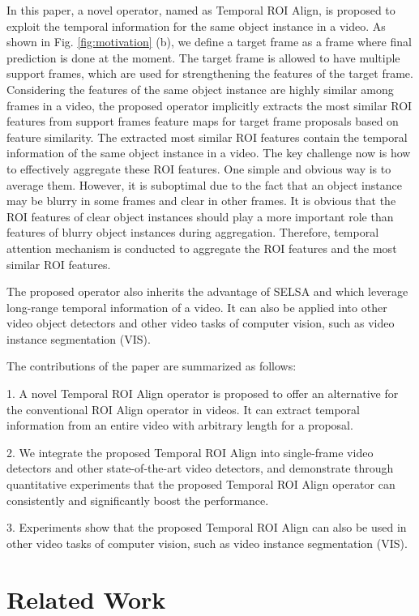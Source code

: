 \documentclass[letterpaper]{article} \usepackage{aaai21}  \usepackage{times}  \usepackage{helvet} \usepackage{courier}  \usepackage[hyphens]{url}  \usepackage{graphicx} \usepackage{hyperref}
\begin{document}
In this paper, a novel operator, named as Temporal ROI Align, is proposed to exploit the temporal information for the same object instance in a video. As shown in Fig. \ref{fig:motivation} (b), we define a target frame as a frame where final prediction is done at the moment. The target frame is allowed to have multiple support frames, which are used for strengthening the features of the target  frame. Considering the features of the same object instance are highly similar among frames in a video, the proposed operator implicitly extracts the most similar ROI features from support frames feature maps for target frame proposals based on feature similarity. The extracted most similar ROI features contain the temporal information of the same object instance in a video. The key challenge now is how to effectively aggregate these ROI features. One simple and obvious way is to average them. However, it is suboptimal due to the fact that an object instance may be blurry in some frames and clear in other frames. It is obvious that the ROI features of clear object instances should play a more important role than features of blurry object instances during aggregation. Therefore, temporal attention mechanism is conducted to aggregate the ROI features and the most similar ROI features.

The proposed operator also inherits the advantage of SELSA \cite{wu2019sequence} and \cite{shvets2019leveraging} which leverage long-range temporal information of a video. It can also be applied into other video object detectors and other video tasks of computer vision, such as video instance segmentation (VIS).

The contributions of the paper are summarized as follows:

1. A novel Temporal ROI Align operator is proposed to offer an alternative for the conventional ROI Align operator in videos. It can extract temporal information from an entire video with arbitrary length for a proposal.

2. We integrate the proposed Temporal ROI Align into single-frame video detectors and other state-of-the-art video detectors, and demonstrate through quantitative experiments that the proposed Temporal ROI Align operator can consistently and significantly boost the performance.



3. Experiments show that the proposed Temporal ROI Align can also be used in other video tasks of computer vision, such as video instance segmentation (VIS).
 \section{Related Work}
\end{document}
